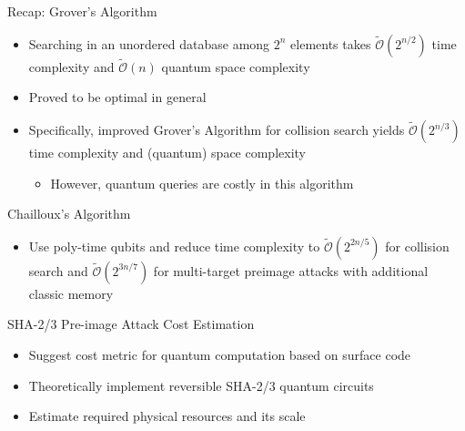 \documentclass{beamer}
\begin{document}
    \begin{frame}{Recap: Grover's Algorithm}
        \begin{itemize}
            \item Searching in an unordered database among $2^n$ elements takes $\tilde{\mathcal{O}}(2^{n/2})$ time complexity and $\tilde{\mathcal{O}}(n)$ quantum space complexity
            \item Proved to be optimal in general
            \item Specifically, improved Grover's Algorithm for collision search yields $\tilde{\mathcal{O}}(2^{n/3})$ time complexity and (quantum) space complexity \cite{brassard1998quantum}
            \begin{itemize}
                \item However, quantum queries are costly in this algorithm
            \end{itemize}
        \end{itemize}
    \end{frame}
    
    \begin{frame}{Chailloux's Algorithm \cite{chailloux2017efficient}}
        \begin{itemize}
            \item Use poly-time qubits and reduce time complexity to $\tilde{\mathcal{O}}(2^{2n/5})$ for collision search and $\tilde{\mathcal{O}}(2^{3n/7})$ for multi-target preimage attacks with additional classic memory
        \end{itemize}
    \end{frame}
    
    \begin{frame}{SHA-2/3 Pre-image Attack Cost Estimation \cite{amy2016estimating}}
        \begin{itemize}
            \item Suggest cost metric for quantum computation based on surface code
            \item Theoretically implement reversible SHA-2/3 quantum circuits
            \item Estimate required physical resources and its scale
        \end{itemize}
    \end{frame}
    
\end{document}
